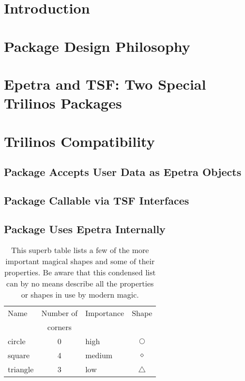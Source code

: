\documentclass[12pt,strict]{SANDreport}
\begin{document}
\section{Introduction}

\section{Package Design Philosophy}

\section{Epetra and TSF: Two Special Trilinos Packages}

\section{Trilinos Compatibility}

\subsection{Package Accepts User Data as Epetra Objects}
\subsection{Package Callable via TSF Interfaces}
\subsection{Package Uses Epetra Internally}

	\label{Intro}
	    \begin{table}[ht]
		\centering
		\caption[Magical shapes]{This superb table lists a few
		    of the more important magical shapes and some of
		    their properties. Be aware that this condensed list
		    can by no means describe all the properties or
		    shapes in use by modern magic.}
		\bigskip

		\begin{tabular}{|l|c|l|c|}
		    \hline \hline
		    Name  & Number of & Importance & Shape \\
		          & corners   &            &       \\
		    \hline
		    circle & 0        & high       & $\bigcirc$ \\
		    square & 4        & medium     & $\diamond$ \\
		    triangle & 3      & low        & $\triangle$ \\
		    \hline
		\end{tabular}
		\label{tab1}
	    \end{table}
\end{document}
